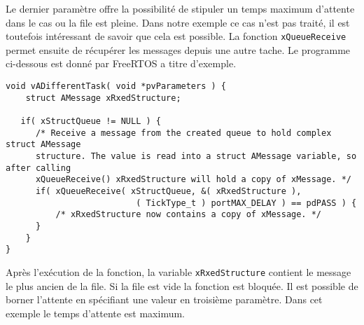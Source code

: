 Le dernier paramètre offre la possibilité de stipuler un temps maximum d'attente dans le cas ou la file est pleine.
Dans notre exemple ce cas n'est pas traité, il est toutefois intéressant de savoir que cela est possible.
La fonction \texttt{xQueueReceive} permet ensuite de récupérer les messages depuis une autre tache.
Le programme ci-dessous est donné par FreeRTOS \cite{web_freeRTOS_queueReceive} a titre d'exemple.
\begin{lstlisting}[style=CStyle]
void vADifferentTask( void *pvParameters ) {
    struct AMessage xRxedStructure;

   if( xStructQueue != NULL ) {
      /* Receive a message from the created queue to hold complex struct AMessage
      structure. The value is read into a struct AMessage variable, so after calling
      xQueueReceive() xRxedStructure will hold a copy of xMessage. */
      if( xQueueReceive( xStructQueue, &( xRxedStructure ),
                          ( TickType_t ) portMAX_DELAY ) == pdPASS ) {
          /* xRxedStructure now contains a copy of xMessage. */
      }
    }
}
\end{lstlisting}
Après l'exécution de la fonction, la variable \texttt{xRxedStructure} contient le message le plus ancien de la file.
Si la file est vide la fonction est bloquée.
Il est possible de borner l'attente en spécifiant une valeur en troisième paramètre.
Dans cet exemple le temps d'attente est maximum.




